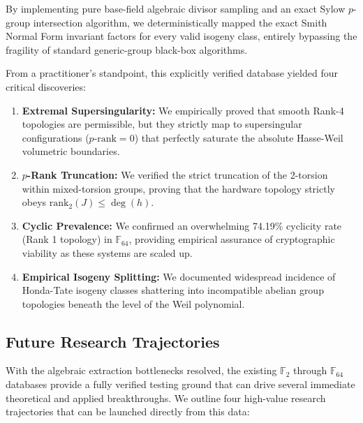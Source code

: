 \documentclass[letterpaper, 11pt]{article}
\begin{document}
By implementing pure base-field algebraic divisor sampling and an exact Sylow $p$-group intersection algorithm, we deterministically mapped the exact Smith Normal Form invariant factors for every valid isogeny class, entirely bypassing the fragility of standard generic-group black-box algorithms.

From a practitioner's standpoint, this explicitly verified database yielded four critical discoveries:
\begin{enumerate}
    \item \textbf{Extremal Supersingularity:} We empirically proved that smooth Rank-4 topologies are permissible, but they strictly map to supersingular configurations ($p\text{-rank} = 0$) that perfectly saturate the absolute Hasse-Weil volumetric boundaries.
    \item \textbf{$p$-Rank Truncation:} We verified the strict truncation of the 2-torsion within mixed-torsion groups, proving that the hardware topology strictly obeys $\text{rank}_2(J) \le \deg(h)$.
    \item \textbf{Cyclic Prevalence:} We confirmed an overwhelming 74.19\% cyclicity rate (Rank 1 topology) in $\mathbb{F}_{64}$, providing empirical assurance of cryptographic viability as these systems are scaled up.
    \item \textbf{Empirical Isogeny Splitting:} We documented widespread incidence of Honda-Tate isogeny classes shattering into incompatible abelian group topologies beneath the level of the Weil polynomial.
\end{enumerate}

\subsection{Future Research Trajectories}
With the algebraic extraction bottlenecks resolved, the existing $\mathbb{F}_2$ through $\mathbb{F}_{64}$ databases provide a fully verified testing ground that can drive several immediate theoretical and applied breakthroughs. We outline four high-value research trajectories that can be launched directly from this data:
\end{document}
